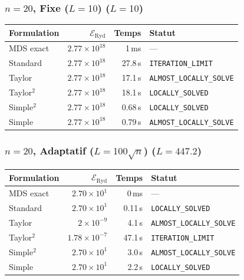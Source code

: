 \subsubsection{$n=20$, Fixe ($L{=}10$) ($L=10$)}
\begin{longtable}{@{}lrrl@{}}
  \toprule
  Formulation & $\mathcal{E}_{\mathrm{Ryd}}$ & Temps & Statut \\
  \midrule
  \endhead
  MDS exact & $2.77\times10^{18}$ & 1\,ms & --- \\
  Standard & $2.77\times10^{18}$ & 27.8\,s & \texttt{ITERATION\_LIMIT} \\
  Taylor & $2.77\times10^{18}$ & 17.1\,s & \texttt{ALMOST\_LOCALLY\_SOLVE} \\
  Taylor$^2$ & $2.77\times10^{18}$ & 18.1\,s & \texttt{LOCALLY\_SOLVED} \\
  Simple$^2$ & $2.77\times10^{18}$ & 0.68\,s & \texttt{LOCALLY\_SOLVED} \\
  Simple & $2.77\times10^{18}$ & 0.79\,s & \texttt{ALMOST\_LOCALLY\_SOLVE} \\
  \bottomrule
\end{longtable}

\subsubsection{$n=20$, Adaptatif ($L{=}100\sqrt{n}$) ($L=447.2$)}
\begin{longtable}{@{}lrrl@{}}
  \toprule
  Formulation & $\mathcal{E}_{\mathrm{Ryd}}$ & Temps & Statut \\
  \midrule
  \endhead
  MDS exact & $2.70\times10^{1}$ & 0\,ms & --- \\
  Standard & $2.70\times10^{1}$ & 0.11\,s & \texttt{LOCALLY\_SOLVED} \\
  Taylor & $2\times10^{-9}$ & 4.1\,s & \texttt{ALMOST\_LOCALLY\_SOLVE} \\
  Taylor$^2$ & $1.78\times10^{-7}$ & 47.1\,s & \texttt{ITERATION\_LIMIT} \\
  Simple$^2$ & $2.70\times10^{1}$ & 3.0\,s & \texttt{ALMOST\_LOCALLY\_SOLVE} \\
  Simple & $2.70\times10^{1}$ & 2.2\,s & \texttt{LOCALLY\_SOLVED} \\
  \bottomrule
\end{longtable}

